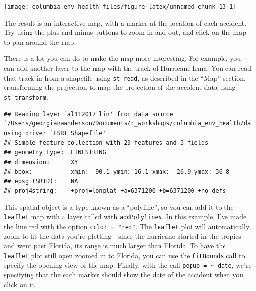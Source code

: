 \documentclass[]{tufte-book}
\newenvironment{Shaded}{}{}
\newcommand{\DataTypeTok}[1]{\textcolor[rgb]{0.56,0.13,0.00}{#1}}
\newcommand{\DecValTok}[1]{\textcolor[rgb]{0.25,0.63,0.44}{#1}}
\newcommand{\KeywordTok}[1]{\textcolor[rgb]{0.00,0.44,0.13}{\textbf{#1}}}
\newcommand{\NormalTok}[1]{#1}
\newcommand{\OperatorTok}[1]{\textcolor[rgb]{0.40,0.40,0.40}{#1}}
\newcommand{\StringTok}[1]{\textcolor[rgb]{0.25,0.44,0.63}{#1}}
\begin{document}
\texttt{[image: columbia\_env\_health\_files/figure-latex/unnamed-chunk-13-1]}

The result is an interactive map, with a marker at the location of each accident. Try using the
plus and minus buttons to zoom in and out, and click on the map to pan around the map.

There is a lot you can do to make the map more interesting. For example, you can add another layer
to the map with the track of Hurricane Irma. You can read that track in from a shapefile using
\texttt{st\_read}, as described in the ``Map'' section, transforming the projection to map the projection
of the accident data using \texttt{st\_transform}.

\begin{Shaded}
\end{Shaded}

\begin{verbatim}
## Reading layer `al112017_lin' from data source `/Users/georgianaanderson/Documents/r_workshops/columbia_env_health/data/al112017_best_track' using driver `ESRI Shapefile'
## Simple feature collection with 20 features and 3 fields
## geometry type:  LINESTRING
## dimension:      XY
## bbox:           xmin: -90.1 ymin: 16.1 xmax: -26.9 ymax: 36.8
## epsg (SRID):    NA
## proj4string:    +proj=longlat +a=6371200 +b=6371200 +no_defs
\end{verbatim}

This spatial object is a type known as a ``polyline'', so you can add it to the \texttt{leaflet} map with a
layer called with \texttt{addPolylines}. In this example, I've made the line red with the option
\texttt{color\ =\ "red"}. The \texttt{leaflet} plot will automatically zoom to fit the data you're plotting---since
the hurricane started in the tropics and went past Florida, its range is much larger than Florida.
To have the \texttt{leaflet} plot still open zoomed in to Florida, you can use the \texttt{fitBounds} call to
specify the opening view of the map. Finally, with the call \texttt{popup\ =\ \textasciitilde{}\ date}, we're specifying that
the each marker should show the date of the accident when you click on it.
\end{document}
